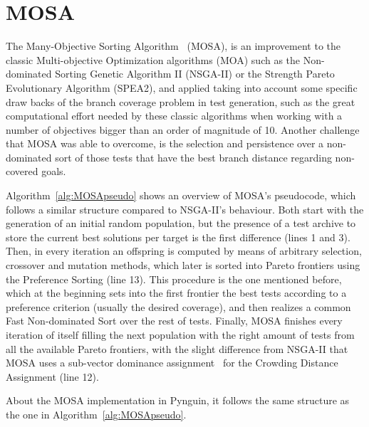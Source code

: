 \documentclass[%
  chapterprefix=false,%
  open=right,%
  twoside=true,%
  paper=a4,%
  logofile={Figures/logo.png},%
  thesistype=master,%
  UKenglish,%
]{se2thesis}
\begin{document}
\section{MOSA}

The Many-Objective Sorting Algorithm~\cite{DBLP:conf/icst/PanichellaKT15} (MOSA), is an improvement to the classic Multi-objective Optimization algorithms (MOA) such as the Non-dominated Sorting Genetic Algorithm II (NSGA-II) or the Strength Pareto Evolutionary Algorithm (SPEA2), and applied taking into account some specific draw backs of the branch coverage problem in test generation, such as the great computational effort needed by these classic algorithms when working with a number of objectives bigger than an order of magnitude of 10.
Another challenge that MOSA was able to overcome, is the selection and persistence over a non-dominated sort of those tests that have the best branch distance regarding non-covered goals.

Algorithm~\ref{alg:MOSApseudo} shows an overview of MOSA's pseudocode, which follows a similar structure compared to NSGA-II's behaviour.
Both start with the generation of an initial random population, but the presence of a test archive to store the current best solutions per target is the first difference (lines 1 and 3).
Then, in every iteration an offspring is computed by means of arbitrary selection, crossover and mutation methods, which later is sorted into Pareto frontiers using the Preference Sorting (line 13).
This procedure is the one mentioned before, which at the beginning sets into the first frontier the best tests according to a preference criterion (usually the desired coverage), and then realizes a common Fast Non-dominated Sort over the rest of tests.
Finally, MOSA finishes every iteration of itself filling the next population with the right amount of tests from all the available Pareto frontiers, with the slight difference from NSGA-II that MOSA uses a sub-vector dominance assignment~\cite{DBLP:conf/issta/KifetewPLOT13} for the Crowding Distance Assignment (line 12).

About the MOSA implementation in Pynguin, it follows the same structure as the one in Algorithm~\ref{alg:MOSApseudo}.


\algrenewcommand{}
\algrenewcommand{}
\end{document}
